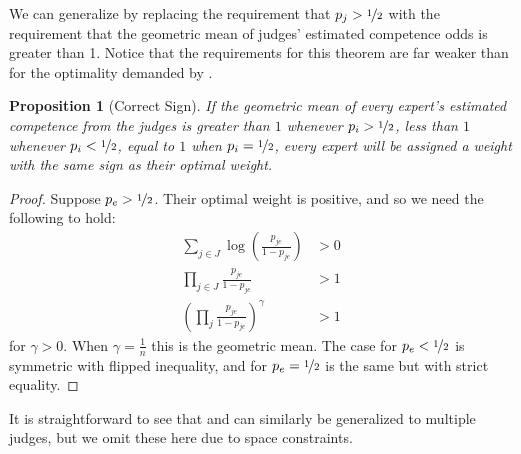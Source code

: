 \documentclass[letterpaper]{article} %
\newtheorem{proposition}{Proposition}
\newcommand{\judge}{\ensuremath{j} }
\newcommand{\judges}{\ensuremath{J} }
\newcommand{\expert}{\ensuremath{e} }
\newcommand{\ben}[1]{\textcolor{red}{Ben says: #1}}
\begin{document}
We can generalize  by replacing the requirement that $p_j > \nicefrac{1}{2}$ with the requirement that the geometric mean of judges' estimated competence odds is greater than 1. Notice that the requirements for this theorem are far weaker than for the optimality demanded by .


\begin{proposition}[Correct Sign]\label{theorem:rightsign}
If the geometric mean of every expert's estimated competence from the judges is greater than $1$ whenever $p_i > \nicefrac{1}{2}$, less than $1$ whenever $p_i < \nicefrac{1}{2}$, equal to $1$ when $p_i = \nicefrac{1}{2}$, every expert will be assigned a weight with the same sign as their optimal weight.
\end{proposition}

\begin{proof}
%
Suppose $p_\expert > \nicefrac{1}{2}$. Their optimal weight is positive, and so we need the following to hold: 
\scriptsize
\begin{align*}
 \sum\limits_{\judge \in \judges} \log\left(\frac{p_{\judge\expert}}{1-p_{\judge\expert}}\right) & > 0\\ 
\prod\limits_{\judge \in \judges} \frac{p_{\judge\expert}}{1-p_{\judge\expert}} & > 1 \\ 
\left(\prod\limits_\judge \frac{p_{\judge\expert}}{1-p_{\judge\expert}} \right)^\gamma & > 1
\end{align*}
\normalsize
for $\gamma > 0$. When $\gamma = \frac{1}{n}$ this is the geometric mean.
%
The case for $p_\expert < \nicefrac{1}{2}$ is symmetric with flipped inequality, and for $p_\expert = \nicefrac{1}{2}$ is the same but with strict equality.
\end{proof}

It is straightforward to see that  and  can similarly be generalized to multiple judges, but we omit these here due to space constraints.



\end{document}
